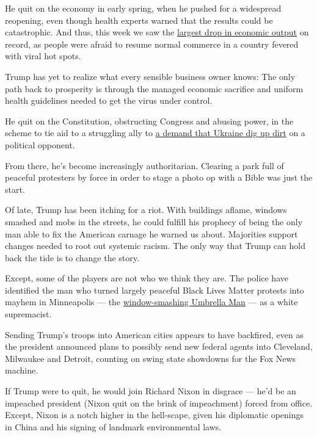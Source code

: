 He quit on the economy in early spring, when he pushed for a widespread
reopening, even though health experts warned that the results could be
catastrophic. And thus, this week we saw the
\href{https://www.nytimes3xbfgragh.onion/2020/07/30/business/economy/q2-gdp-coronavirus-economy.html}{largest
drop in economic output} on record, as people were afraid to resume
normal commerce in a country fevered with viral hot spots.

Trump has yet to realize what every sensible business owner knows: The
only path back to prosperity is through the managed economic sacrifice
and uniform health guidelines needed to get the virus under control.

He quit on the Constitution, obstructing Congress and abusing power, in
the scheme to tie aid to a struggling ally to
\href{https://www.nytimes3xbfgragh.onion/2019/11/04/opinion/trump-ukraine.html}{a
demand that Ukraine dig up dirt} on a political opponent.

From there, he's become increasingly authoritarian. Clearing a park full
of peaceful protesters by force in order to stage a photo op with a
Bible was just the start.

Of late, Trump has been itching for a riot. With buildings aflame,
windows smashed and mobs in the streets, he could fulfill his prophecy
of being the only man able to fix the American carnage he warned us
about. Majorities support changes needed to root out systemic racism.
The only way that Trump can hold back the tide is to change the story.

Except, some of the players are not who we think they are. The police
have identified the man who turned largely peaceful Black Lives Matter
protests into mayhem in Minneapolis --- the
\href{https://www.startribune.com/police-umbrella-man-was-a-white-supremacist-trying-to-incite-floyd-rioting/571932272/}{window-smashing
Umbrella Man} --- as a white supremacist.

Sending Trump's troops into American cities appears to have backfired,
even as the president announced plans to possibly send new federal
agents into Cleveland, Milwaukee and Detroit, counting on swing state
showdowns for the Fox News machine.

If Trump were to quit, he would join Richard Nixon in disgrace --- he'd
be an impeached president (Nixon quit on the brink of impeachment)
forced from office. Except, Nixon is a notch higher in the hell-scape,
given his diplomatic openings in China and his signing of landmark
environmental laws.

